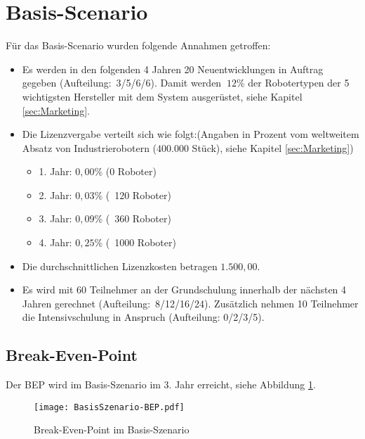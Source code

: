 \section{Basis-Scenario}
Für das Basis-Scenario wurden folgende Annahmen getroffen:
\begin{itemize}
	\item Es werden in den folgenden 4 Jahren 20 Neuentwicklungen in Auftrag gegeben (Aufteilung:~3/5/6/6). Damit werden $~12$\% der Robotertypen der 5 wichtigsten Hersteller mit dem System ausgerüstet, siehe Kapitel \ref{sec:Marketing}.
	\item Die Lizenzvergabe verteilt sich wie folgt:\newline (Angaben in Prozent vom weltweitem Absatz von Industrierobotern ($400.000$ Stück), siehe Kapitel \ref{sec:Marketing})
	\begin{itemize}
		\item 1. Jahr: $0,00$\% (0 Roboter)
		\item 2. Jahr: $0,03$\% (~120 Roboter)
		\item 3. Jahr: $0,09$\% (~360 Roboter)
		\item 4. Jahr: $0,25$\% (~1000 Roboter)
	\end{itemize}
	\item Die durchschnittlichen Lizenzkosten betragen $1.500,00$\officialeuro.
	\item Es wird mit 60 Teilnehmer an der Grundschulung innerhalb der nächsten 4 Jahren gerechnet (Aufteilung:~8/12/16/24). Zusätzlich nehmen 10 Teilnehmer die Intensivschulung in Anspruch (Aufteilung: 0/2/3/5).
\end{itemize}

\subsection{Break-Even-Point}
Der BEP wird im Basis-Szenario im 3. Jahr erreicht, siehe Abbildung \ref{fig:BasisSzenario-BEP}.
\begin{figure}[h]
	\centering
	\texttt{[image: BasisSzenario-BEP.pdf]}
	\caption{Break-Even-Point im Basis-Szenario}
	\label{fig:BasisSzenario-BEP}
\end{figure}

